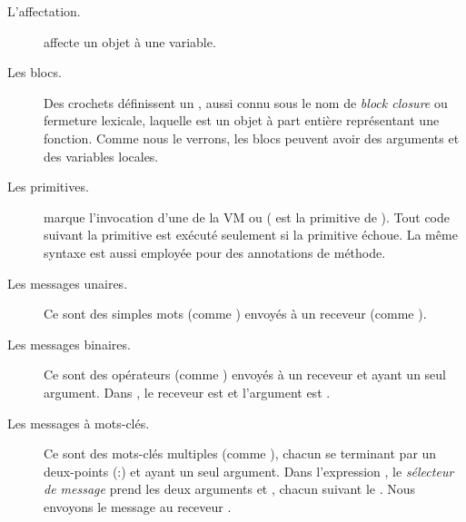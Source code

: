 \documentclass[a4paper,10pt,twoside]{book}
\begin{document}
\begin{description}
\item[L'affectation.]	\ct{:=} affecte un objet à une variable.

\item[Les blocs.] Des crochets \ct{[ ]} définissent un ,
  aussi connu sous le nom de \emph{block closure} ou fermeture lexicale, laquelle est un 
objet à part entière représentant une fonction.
Comme nous le verrons, les blocs peuvent avoir des arguments et des variables locales.

\item[Les primitives.]	 marque l'invocation
  d'une  de la VM ou 
( est la primitive de ).
Tout code suivant la primitive est exécuté seulement si la
primitive échoue.
La même syntaxe est aussi employée pour des annotations de
méthode. %

\item[Les messages unaires.] Ce sont des simples mots (comme ) envoyés à un receveur (comme ).

\item[Les messages binaires.] Ce sont des opérateurs (comme \ct{+}) envoyés à un receveur et ayant un seul argument. Dans , le receveur est  et l'argument est .

\item[Les messages à mots-clés.] Ce sont des mots-clés multiples (comme ), chacun se terminant par un deux-points (:) et ayant un seul argument. 
Dans l'expression , le \emph{sélecteur de message}  prend les deux arguments  et , chacun suivant le \lct{:}. Nous envoyons le message au receveur .


\end{description}
\end{document}

